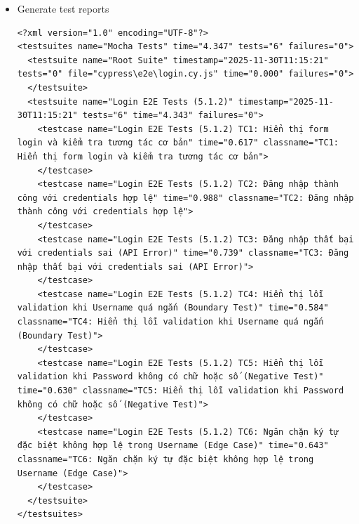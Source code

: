 \documentclass[a4paper,12pt]{article}
\begin{document}
{\begin{itemize}
    \item Generate test reports
\begin{tcolorbox}[breakable, colback=green!5,colframe=black!50,title=Generate test reports]
\begin{lstlisting}
<?xml version="1.0" encoding="UTF-8"?>
<testsuites name="Mocha Tests" time="4.347" tests="6" failures="0">
  <testsuite name="Root Suite" timestamp="2025-11-30T11:15:21" tests="0" file="cypress\e2e\login.cy.js" time="0.000" failures="0">
  </testsuite>
  <testsuite name="Login E2E Tests (5.1.2)" timestamp="2025-11-30T11:15:21" tests="6" time="4.343" failures="0">
    <testcase name="Login E2E Tests (5.1.2) TC1: Hiển thị form login và kiểm tra tương tác cơ bản" time="0.617" classname="TC1: Hiển thị form login và kiểm tra tương tác cơ bản">
    </testcase>
    <testcase name="Login E2E Tests (5.1.2) TC2: Đăng nhập thành công với credentials hợp lệ" time="0.988" classname="TC2: Đăng nhập thành công với credentials hợp lệ">
    </testcase>
    <testcase name="Login E2E Tests (5.1.2) TC3: Đăng nhập thất bại với credentials sai (API Error)" time="0.739" classname="TC3: Đăng nhập thất bại với credentials sai (API Error)">
    </testcase>
    <testcase name="Login E2E Tests (5.1.2) TC4: Hiển thị lỗi validation khi Username quá ngắn (Boundary Test)" time="0.584" classname="TC4: Hiển thị lỗi validation khi Username quá ngắn (Boundary Test)">
    </testcase>
    <testcase name="Login E2E Tests (5.1.2) TC5: Hiển thị lỗi validation khi Password không có chữ hoặc số (Negative Test)" time="0.630" classname="TC5: Hiển thị lỗi validation khi Password không có chữ hoặc số (Negative Test)">
    </testcase>
    <testcase name="Login E2E Tests (5.1.2) TC6: Ngăn chặn ký tự đặc biệt không hợp lệ trong Username (Edge Case)" time="0.643" classname="TC6: Ngăn chặn ký tự đặc biệt không hợp lệ trong Username (Edge Case)">
    </testcase>
  </testsuite>
</testsuites>
\end{lstlisting}
\end{tcolorbox}



\end{itemize}}
\end{document}
